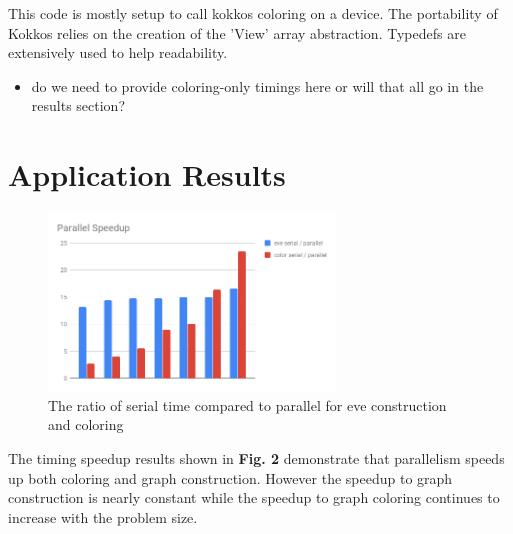 \documentclass[graybox]{svmult}
\begin{document}
This code is mostly setup to call kokkos coloring on a device.
The portability of Kokkos relies on the creation of the 'View' array
abstraction.
Typedefs are extensively used to help readability.

\begin{itemize}
  \item do we need to provide coloring-only timings here or will that all go in
    the results section?
\end{itemize}

\section{Application Results} \label{sec:results}

\begin{figure}[!ht]
	\centering
	\includegraphics[width=3in]{images/Parallel_Speedup.png}
	\caption{The ratio of serial time compared to parallel for eve construction and coloring }
	\label{fig:edgecounts}
\end{figure}
The timing speedup results shown in \textbf{Fig. 2} demonstrate that parallelism speeds up both coloring and graph construction. However the speedup to graph construction is nearly constant while the speedup to graph coloring continues to increase with the problem size.
\end{document}
